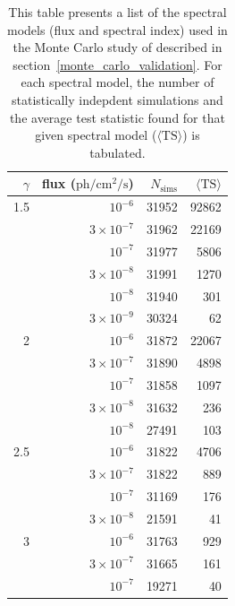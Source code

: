 \documentclass[preprint]{aastex}
\newcommand{\s}{\text{s}\xspace}
\newcommand{\ph}{\text{ph}\xspace}
\newcommand{\cm}{\text{cm}\xspace}
\newcommand{\ts}{\text{TS}\xspace}
\newcommand{\pointlike}{\text{\em pointlike}\xspace}
\begin{document}
\begin{table}
  \begin{centering}
    \begin{tabular}{ r | r | r | r }
      \hline
      \hline
      $\gamma$ & flux ($\ph/\cm^2/\s$) & $N_\text{sims}$ & $\langle\ts\rangle$ \\
      \hline
      1.5 &          $10^{-6}$ &           31952 &  92862 \\
      &  $3\times 10^{-7}$ &           31962 &  22169 \\
      &          $10^{-7}$ &           31977 &   5806 \\
      &  $3\times 10^{-8}$ &           31991 &   1270 \\
      &          $10^{-8}$ &           31940 &    301 \\
      &  $3\times 10^{-9}$ &           30324 &     62 \\
      \hline
      2 &          $10^{-6}$ &           31872 &  22067 \\
      &  $3\times 10^{-7}$ &           31890 &   4898 \\
      &          $10^{-7}$ &           31858 &   1097 \\
      &  $3\times 10^{-8}$ &           31632 &    236 \\
      &          $10^{-8}$ &           27491 &    103 \\
      \hline
      2.5 &          $10^{-6}$ &           31822 &   4706 \\
      &  $3\times 10^{-7}$ &           31822 &    889 \\
      &          $10^{-7}$ &           31169 &    176 \\
      &  $3\times 10^{-8}$ &           21591 &     41 \\
      \hline                                                
      3 &          $10^{-6}$ &           31763 &    929 \\
      &  $3\times 10^{-7}$ &           31665 &    161 \\
      &          $10^{-7}$ &           19271 &     40 \\
      \hline
    \end{tabular}
    \caption{
    This table presents a list of the spectral models (flux and spectral
    index) used in the Monte Carlo study of \pointlike described in
    section~\ref{monte_carlo_validation}.  For each spectral model, the
    number of statistically indepdent simulations and the average test
    statistic found for that given spectral model ($\langle\ts\rangle$) is tabulated.
}
\end{centering}
\end{table}
\end{document}
